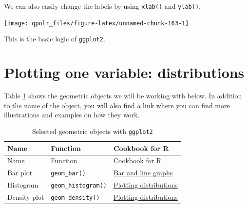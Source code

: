 \documentclass[12pt,oneside]{reedthesis}
\theoremstyle{definition}
\theoremstyle{definition}
\theoremstyle{definition}
\theoremstyle{remark}
\begin{document}
  We can also easily change the labels by using \texttt{xlab()} and
  \texttt{ylab()}.
  \begin{Shaded}
  \begin{Highlighting}[]
  \NormalTok{(}\OperatorTok{+}
  \StringTok{  }\NormalTok{() }\OperatorTok{+}
  \StringTok{  }\NormalTok{() }\OperatorTok{+}
  \StringTok{  }\NormalTok{(}\NormalTok{) }\OperatorTok{+}
  \StringTok{  }\NormalTok{(}\NormalTok{)}
  \end{Highlighting}
  \end{Shaded}
  \begin{center}\texttt{[image: qpolr\_files/figure-latex/unnamed-chunk-163-1]} \end{center}
  
  This is the basic logic of \texttt{ggplot2}.
  
  \section{Plotting one variable:
  distributions}\label{plotting-one-variable-distributions}
  
  Table \ref{tab:distributions} shows the geometric objects we will be
  working with below. In addition to the name of the object, you will also
  find a link where you can find more illustrations and examples on how
  they work.
  \begin{longtable}[]{@{}lll@{}}
  \caption{\label{tab:distributions} Selected geometric objects with
  \texttt{ggplot2}}\tabularnewline
  \toprule
  Name & Function & Cookbook for R\tabularnewline
  \midrule
  \endfirsthead
  \toprule
  Name & Function & Cookbook for R\tabularnewline
  \midrule
  \endhead
  Bar plot & \texttt{geom\_bar()} &
  \href{http://www.cookbook-r.com/Graphs/Bar_and_line_graphs_(ggplot2)/}{Bar
  and line graphs}\tabularnewline
  Histogram & \texttt{geom\_histogram()} &
  \href{http://www.cookbook-r.com/Graphs/Plotting_distributions_(ggplot2)/}{Plotting
  distributions}\tabularnewline
  Density plot & \texttt{geom\_density()} &
  \href{http://www.cookbook-r.com/Graphs/Plotting_distributions_(ggplot2)/}{Plotting
  distributions}\tabularnewline
  \bottomrule
  \end{longtable}
\end{document}
